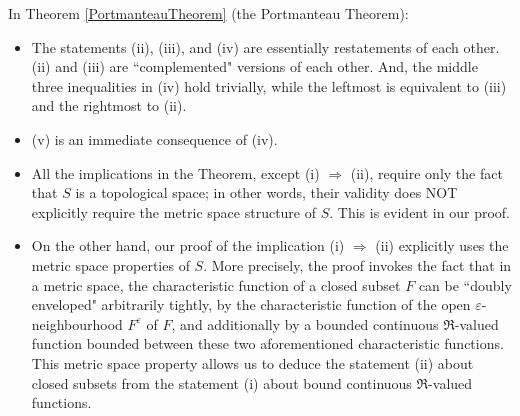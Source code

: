 \begin{remark}\mbox{}\;
In Theorem \ref{PortmanteauTheorem} (the Portmanteau Theorem):
\begin{itemize}
\item	The statements (ii), (iii), and (iv) are essentially restatements of each other.
		(ii) and (iii) are ``complemented" versions of each other.
		And, the middle three inequalities in (iv) hold trivially, while the leftmost is equivalent to (iii) and the rightmost to (ii).
\item	(v) is an immediate consequence of (iv).
\item	All the implications in the Theorem, except (i) $\Longrightarrow$ (ii), require only the fact that $S$ is a topological space;
		in other words, their validity does NOT explicitly require the metric space structure of $S$.
		This is evident in our proof.
\item	On the other hand, our proof of the implication (i) $\Longrightarrow$ (ii) explicitly uses the metric space properties of $S$.
		More precisely, the proof invokes the fact that in a metric space, the characteristic function
		of a closed subset $F$ can be ``doubly enveloped" arbitrarily tightly, by the characteristic function of the
		open $\varepsilon$-neighbourhood $F^{\varepsilon}$ of $F$, and additionally by a bounded continuous
		$\Re$-valued function bounded between these two aforementioned characteristic functions.
		This metric space property allows us to deduce the statement (ii) about closed subsets
		from the statement (i) about bound continuous $\Re$-valued functions.
\end{itemize}
\end{remark}

